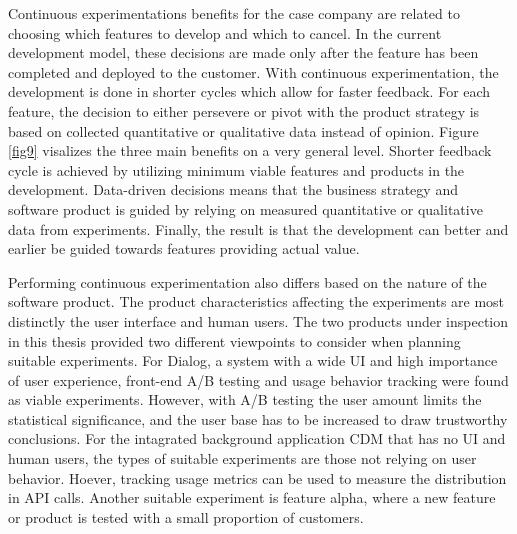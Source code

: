 \documentclass[english]{tktltiki2}
\theoremstyle{definition}
\theoremstyle{remark}
\begin{document}


Continuous experimentations benefits for the case company are related to choosing which features to develop and which to cancel. In the current development model, these decisions are made only after the feature has been completed and deployed to the customer. With continuous experimentation, the development is done in shorter cycles which allow for faster feedback. For each feature, the decision to either persevere or pivot with the product strategy is based on collected quantitative or qualitative data instead of opinion. Figure \ref{fig9} visalizes the three main benefits on a very general level. Shorter feedback cycle is achieved by utilizing minimum viable features and products in the development. Data-driven decisions means that the business strategy and software product is guided by relying on measured quantitative or qualitative data from experiments. Finally, the result is that the development can better and earlier be guided towards features providing actual value.



Performing continuous experimentation also differs based on the nature of the software product. The product characteristics affecting the experiments are most distinctly the user interface and human users. The two products under inspection in this thesis provided two different viewpoints to consider when planning suitable experiments. For Dialog, a system with a wide UI and high importance of user experience, front-end A/B testing and usage behavior tracking were found as viable experiments. However, with A/B testing the user amount limits the statistical significance, and the user base has to be increased to draw trustworthy conclusions. For the intagrated background application CDM that has no UI and human users, the types of suitable experiments are those not relying on user behavior. Hoever, tracking usage metrics can be used to measure the distribution in API calls. Another suitable experiment is feature alpha, where a new feature or product is tested with a small proportion of customers.
\end{document}
